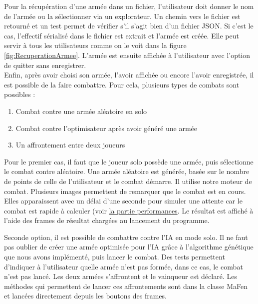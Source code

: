 \documentclass[a4paper]{article} %
\begin{document}
Pour la récupération d'une armée dans un fichier, l'utilisateur doit donner le nom de l'armée ou la sélectionner via un explorateur. Un chemin vers le fichier est retourné et un test permet de vérifier s'il s'agit bien d'un fichier JSON. Si c'est le cas, l'effectif sérialisé dans le fichier est extrait et l'armée est créée. Elle peut servir à tous les utilisateurs comme on le voit dans la figure \ref{fig:RecuperationArmee}. L'armée est ensuite affichée à l'utilisateur avec l'option de quitter sans enregistrer.\\

Enfin, après avoir choisi son armée, l'avoir affichée ou encore l'avoir enregistrée, il est possible de la faire combattre. Pour cela, plusieurs types de combats sont possibles :
\begin{enumerate}
	\item Combat contre une armée aléatoire en solo
	\item Combat contre l'optimisateur après avoir généré une armée
	\item Un affrontement entre deux joueurs
\end{enumerate}

Pour le premier cas, il faut que le joueur solo possède une armée, puis sélectionne le combat contre aléatoire. Une armée aléatoire est générée, basée sur le nombre de points de celle de l'utilisateur et le combat démarre. Il utilise notre moteur de combat. Plusieurs images permettent de remarquer que le combat est en cours. Elles apparaissent avec un délai d'une seconde pour simuler une attente car le combat est rapide à calculer (voir \hyperref[performances]{la partie performances}. Le résultat est affiché à l'aide des frames de résultat chargées au lancement du programme.

Seconde option, il est possible de combattre contre l'IA en mode solo. Il ne faut pas oublier de créer une armée optimisée pour l'IA grâce à l'algorithme génétique que nous avons implémenté, puis lancer le combat. Des tests permettent d'indiquer à l'utilisateur quelle armée n'est pas formée, dans ce cas, le combat n'est pas lancé. Les deux armées s'affrontent et le vainqueur est déclaré. Les méthodes qui permettent de lancer ces affrontements sont dans la classe MaFen et lancées directement depuis les boutons des frames.
\end{document}
